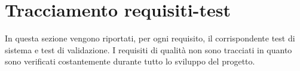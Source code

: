 %


\section{Tracciamento requisiti-test}
In questa sezione vengono riportati, per ogni requisito, il corrispondente test di
sistema e test di validazione. I requisiti di qualità non sono tracciati in quanto sono verificati
costantemente durante tutto lo sviluppo del progetto.




